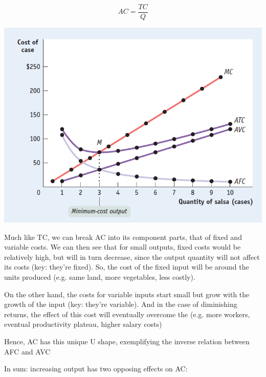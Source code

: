 \documentclass[english,course,draft]{Notes}
\begin{document}
$$AC = \frac{TC}{Q}$$

\includegraphics[width=\textwidth]{avgCost}

\par{Much like TC, we can break AC into its component parts, that of fixed and variable costs. We can then see that for small outputs, fixed costs would be relatively high, but will in turn decrease, since the output quantity will not affect its costs (key: they're fixed). So, the cost of the fixed input will be  around the units produced (e.g. same land, more vegetables, less costly).}
\par{On the other hand, the costs for variable inputs start small but grow with the growth of the input (key: they're variable). And in the case of diminishing returns, the effect of this cost will eventually overcome the  (e.g. more workers, eventual productivity plateau, higher salary costs)}
\par{Hence, AC has this unique U shape, exemplifying the inverse relation between AFC and AVC}

\par{In sum: increasing output has two opposing effects on AC:}


\end{document}
